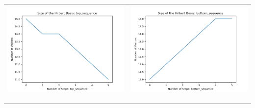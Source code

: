 \documentclass[10pt]{article}
\begin{document}
\begin{tabular}{c|c}
\begin{minipage}{.45\textwidth}
\includegraphics[width=\textwidth]{"DATA/5d/5 generators 2 bound G/top_sequence SIZE"}
\end{minipage} &
\begin{minipage}{.45\textwidth}
\includegraphics[width=\textwidth]{"DATA/5d/5 generators 2 bound G bottomup/bottom_sequence SIZE"}
\end{minipage} \\ \\
\hline \\\begin{minipage}{.45\textwidth}

\end{minipage}
\end{tabular}
\end{document}
